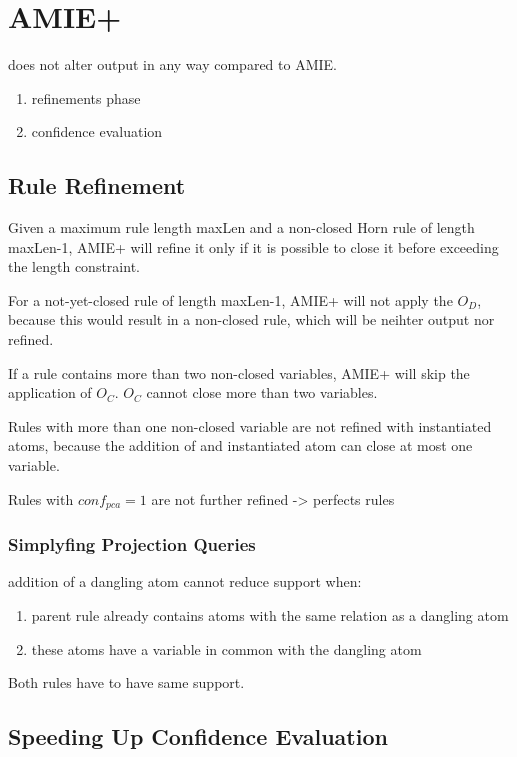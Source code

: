 \section{AMIE+}

does not alter output in any way compared to AMIE.

\begin{enumerate}
    \item refinements phase
    \item confidence evaluation
\end{enumerate}

\subsection{Rule Refinement}

Given a maximum rule length maxLen and a non-closed Horn rule of length maxLen-1, AMIE+ will refine it only if it is possible to close it before exceeding the length constraint.

For a not-yet-closed rule of length maxLen-1, AMIE+ will not apply the $O_{D}$, because this would result in a non-closed rule, which will be neihter output nor refined.

If a rule contains more than two non-closed variables, AMIE+ will skip the application of $O_{C}$. $O_{C}$ cannot close more than two variables.

Rules with more than one non-closed variable are not refined with instantiated atoms, because the addition of and instantiated atom can close at most one variable.

Rules with $conf_{pca} = 1$ are not further refined -> perfects rules

\subsubsection{Simplyfing Projection Queries}

addition of a dangling atom cannot reduce support when:

\begin{enumerate}
    \item parent rule already contains atoms with the same relation as a dangling atom
    \item these atoms have a variable in common with the dangling atom
\end{enumerate}

Both rules have to have same support.

\subsection{Speeding Up Confidence Evaluation}

